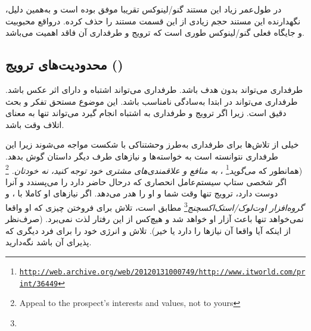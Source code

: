 در طول‌عمر زیاد این مستند گنو/لینوکس تقریبا موفق بوده است و به‌همین دلیل،
نگهدارنده این مستند حجم زیادی از این قسمت مستند را حذف کرده. درواقع
محبوبیت و جایگاه فعلی گنو/لینوکس طوری است که ترویج و طرفداری آن فاقد اهمیت می‌باشد.

\subsection{محدودیت‌های ترویج ()}

طرفداری می‌تواند بدون هدف باشد. طرفداری می‌تواند اشتباه و دارای اثر عکس باشد.
طرفداری می‌تواند در ابتدا به‌سادگی نامناسب باشد. این موضوع مستحق تفکر و بحث دقیق است.
زیرا اگر ترویج و طرفداری به اشتباه انجام گیرد می‌تواند تنها به معنای اتلاف وقت باشد.

خیلی از تلاش‌ها برای طرفداری به‌طرز وحشتناکی با شکست مواجه می‌شوند
زیرا این طرفداری نتوانسته است به خواسته‌ها و نیاز‌های طرف دیگر داستان
گوش بدهد. (همانطور که 
\emph{می‌گوید}\footnote{\texttt{\url{http://web.archive.org/web/20120131000749/http://www.itworld.com/print/36449}}}
،
\emph{
به منافع و علاقمندی‌های مشتری خود توجه کنید، نه خودتان.
}\footnote{Appeal to the prospect's interests and values, not to yours}
اگر شخصی ستاپ سیستم‌عامل انحصاری که درحال حاضر دارد را می‌پسندد
و آنرا دوست دارد، ترویج تنها وقت شما و او را هدر می‌دهد.
اگر نیازهای او کاملا با ،  و
\emph{گروه‌افزار اوت‌لوک/استک‌اکسچنج}\footnote{}
مطابق است، تلاش برای فروختن چیزی که او واقعا نمی‌خواهد 
تنها باعث آزار او خواهد شد و هیچ‌کس از این رفتار لذت نمی‌برد.
(صرف‌نظر از اینکه آیا واقعا آن نیازها را دارد یا خیر).
تلاش و انرژی خود را برای فرد دیگری که پذیرای آن باشد نگه‌‌دارید.

